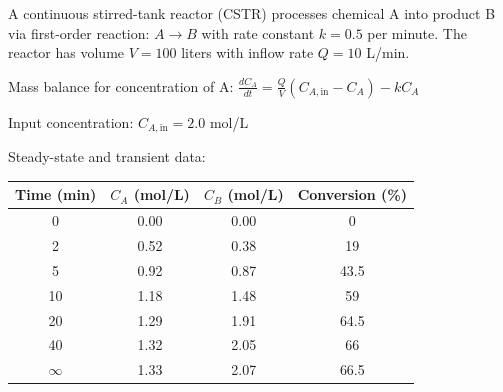 \documentclass[12pt]{article}
\begin{document}
A continuous stirred-tank reactor (CSTR) processes chemical A into product B via first-order reaction: $A \to B$ with rate constant $k = 0.5$ per minute. The reactor has volume $V = 100$ liters with inflow rate $Q = 10$ L/min.

Mass balance for concentration of A: $\frac{dC_A}{dt} = \frac{Q}{V}(C_{A,\text{in}} - C_A) - kC_A$

Input concentration: $C_{A,\text{in}} = 2.0$ mol/L

Steady-state and transient data:

\begin{center}
\begin{tabular}{cccc}
\toprule
Time (min) & $C_A$ (mol/L) & $C_B$ (mol/L) & Conversion (\%) \\
\midrule
0 & 0.00 & 0.00 & 0 \\
2 & 0.52 & 0.38 & 19 \\
5 & 0.92 & 0.87 & 43.5 \\
10 & 1.18 & 1.48 & 59 \\
20 & 1.29 & 1.91 & 64.5 \\
40 & 1.32 & 2.05 & 66 \\
$\infty$ & 1.33 & 2.07 & 66.5 \\
\bottomrule
\end{tabular}
\end{center}
\end{document}

